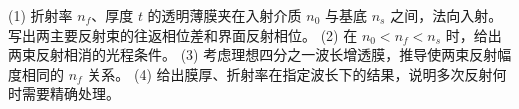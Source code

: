 (1) 折射率 \(n_f\)、厚度 \(t\) 的透明薄膜夹在入射介质 \(n_0\) 与基底 \(n_s\) 之间，法向入射。写出两主要反射束的往返相位差和界面反射相位。
(2) 在 \(n_0<n_f<n_s\) 时，给出两束反射相消的光程条件。
(3) 考虑理想四分之一波长增透膜，推导使两束反射幅度相同的 \(n_f\) 关系。
(4) 给出膜厚、折射率在指定波长下的结果，说明多次反射何时需要精确处理。

